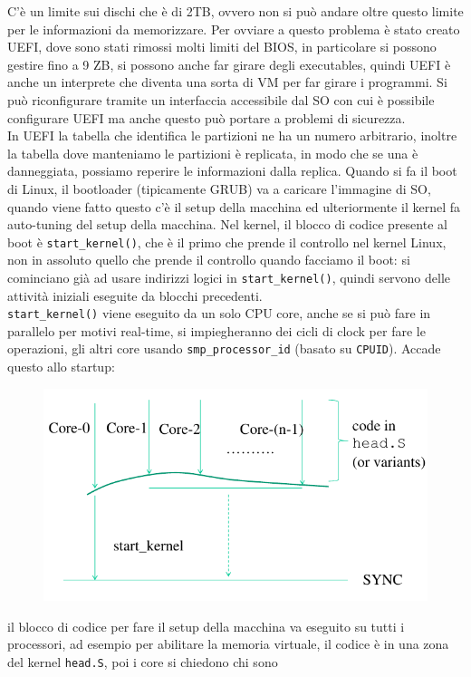 \documentclass[12pt, oneside]{extbook}
\begin{document}
C'è un limite sui dischi che è di 2TB, ovvero non si può andare oltre questo limite per le informazioni da memorizzare. Per ovviare a questo problema è stato creato UEFI, dove sono stati rimossi molti limiti del BIOS, in particolare si possono gestire fino a 9 ZB, si possono anche far girare degli executables, quindi UEFI è anche un interprete che diventa una sorta di VM per far girare i programmi. Si può riconfigurare tramite un interfaccia accessibile dal SO con cui è possibile configurare UEFI ma anche questo può portare a problemi di sicurezza.\\ In UEFI la tabella che identifica le partizioni ne ha un numero arbitrario, inoltre la tabella dove manteniamo le partizioni è replicata, in modo che se una è danneggiata, possiamo reperire le informazioni dalla replica. Quando si fa il boot di Linux, il bootloader (tipicamente GRUB) va a caricare l'immagine di SO, quando viene fatto questo c'è il setup della macchina ed ulteriormente il kernel fa auto-tuning del setup della macchina. Nel kernel, il blocco di codice presente al boot è \texttt{start\_kernel()}, che è il primo che prende il controllo nel kernel Linux, non in assoluto quello che prende il controllo quando facciamo il boot: si cominciano già ad usare indirizzi logici in \texttt{start\_kernel()}, quindi servono delle attività iniziali eseguite da blocchi precedenti.\\ \texttt{start\_kernel()} viene eseguito da un solo CPU core, anche se si può fare in parallelo per motivi real-time, si impiegheranno dei cicli di clock per fare le operazioni, gli altri core usando \texttt{smp\_processor\_id} (basato su \texttt{CPUID}). Accade questo allo startup:
\begin{figure}[!h]
	\includegraphics[scale=0.4]{immagini/boot_cpu_overview.png}
\end{figure}
il blocco di codice per fare il setup della macchina va eseguito su tutti i processori, ad esempio per abilitare la memoria virtuale, il codice è in una zona del kernel \texttt{head.S}, poi i core si chiedono chi sono
\end{document}
